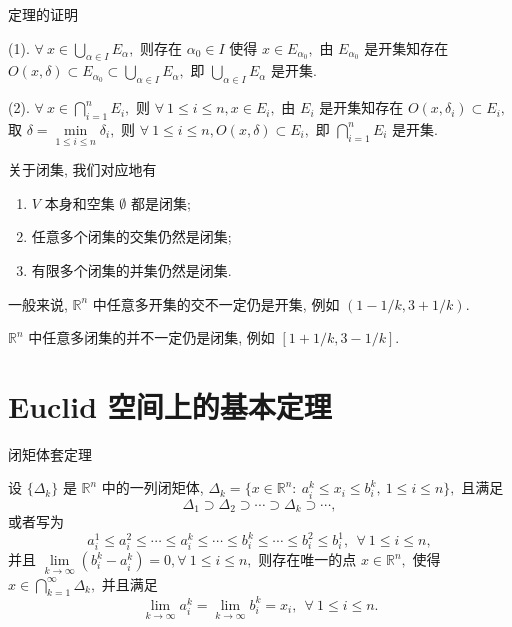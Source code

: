 \begin{frame}{定理的证明}

(1). $\forall~x \in \bigcup\limits_{\alpha \in I} E_{\alpha},$ 则存在 $\alpha_0 \in I$ 使得 $x \in E_{\alpha_0},$ 由 $E_{\alpha_0}$ 是开集知存在 $O(x, \delta) \subset E_{\alpha_0} \subset \bigcup\limits_{\alpha \in I} E_{\alpha},$ 即 $\bigcup\limits_{\alpha \in I} E_{\alpha}$ 是开集.

\pause

(2). $\forall~x \in \bigcap\limits_{i=1}^n E_i,$ 则 $\forall~1 \leqslant i \leqslant n, x \in E_i,$ 由 $E_i$ 是开集知存在 $O(x, \delta_i) \subset E_i,$ 取 $\delta = \min\limits_{1 \leqslant i \leqslant n} \delta_i,$ 则 $\forall~1 \leqslant i \leqslant n, O(x, \delta) \subset E_i,$ 即 $\bigcap\limits_{i=1}^n E_i$ 是开集.

\pause
\vspace{1em}

关于闭集, 我们对应地有
\begin{enumerate}
\item $V$ 本身和空集 $\emptyset$ 都是闭集;
\item 任意多个闭集的交集仍然是闭集;
\item 有限多个闭集的并集仍然是闭集.
\end{enumerate}

\pause
\vspace{1em}

一般来说, $\mathbb{R}^n$ 中任意多开集的交不一定仍是开集,
\pause
例如 $(1 - 1 / k, 3 + 1 / k).$

\pause

$\mathbb{R}^n$ 中任意多闭集的并不一定仍是闭集,
\pause
例如 $[1 + 1 / k, 3 - 1 / k].$

\end{frame}


\section[基本定理]{Euclid 空间上的基本定理}


\begin{frame}{闭矩体套定理}

\begin{thm}[闭矩体套定理]
设 $\{ \Delta_k \}$ 是 $\mathbb{R}^n$ 中的一列闭矩体, $\Delta_k = \{ x \in \mathbb{R}^n: ~ a_i^k \leqslant x_i \leqslant b_i^k, ~ 1 \leqslant i \leqslant n \},$ 且满足
\[\Delta_1 \supset \Delta_2 \supset \cdots \supset \Delta_k \supset \cdots,\]
或者写为
\[a_i^1 \leqslant a_i^2 \leqslant \cdots \leqslant a_i^k \leqslant \cdots \leqslant b_i^k \leqslant \cdots \leqslant b_i^2 \leqslant b_i^1, ~~ \forall~1 \leqslant i \leqslant n,\]
并且 $\lim\limits_{k\to\infty} (b_i^k - a_i^k) = 0, \forall~1 \leqslant i \leqslant n,$ 则存在唯一的点 $x \in \mathbb{R}^n,$ 使得 $x \in \bigcap\limits_{k=1}^{\infty} \Delta_k,$ 并且满足
\[\lim\limits_{k\to\infty} a_i^k = \lim\limits_{k\to\infty} b_i^k = x_i, ~~ \forall~1 \leqslant i \leqslant n.\]
\end{thm}

\end{frame}

